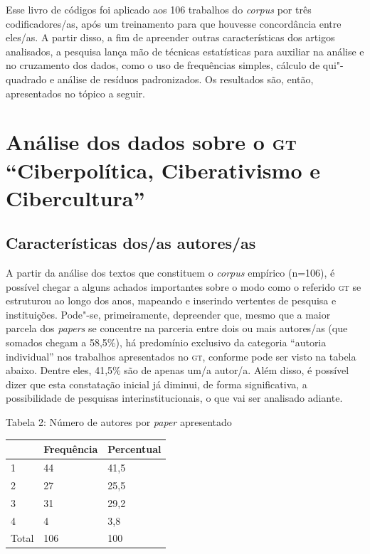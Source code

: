 Esse livro de códigos foi aplicado aos 106 trabalhos do \emph{corpus}
por três codificadores/as, após um treinamento para que houvesse
concordância entre eles/as. A partir disso, a fim de apreender outras
características dos artigos analisados, a pesquisa lança mão de técnicas
estatísticas para auxiliar na análise e no cruzamento dos dados, como o
uso de frequências simples, cálculo de qui"-quadrado e análise de
resíduos padronizados. Os resultados são, então, apresentados no tópico
a seguir.

\section{Análise dos dados sobre o \textsc{gt} ``Ciberpolítica, Ciberativismo e
Cibercultura''}

\subsection{Características dos/as autores/as}

A partir da análise dos textos que constituem o \emph{corpus} empírico
(n=106), é possível chegar a alguns achados importantes sobre o modo
como o referido \textsc{gt} se estruturou ao longo dos anos, mapeando e inserindo
vertentes de pesquisa e instituições. Pode"-se, primeiramente, depreender
que, mesmo que a maior parcela dos \emph{papers} se concentre na
parceria entre dois ou mais autores/as (que somados chegam a 58,5\%), há
predomínio exclusivo da categoria ``autoria individual'' nos trabalhos
apresentados no \textsc{gt}, conforme pode ser visto na tabela abaixo. Dentre
eles, 41,5\% são de apenas um/a autor/a. Além disso, é possível dizer
que esta constatação inicial já diminui, de forma significativa, a
possibilidade de pesquisas interinstitucionais, o que vai ser analisado
adiante.

\begin{center}
Tabela 2: Número de autores por \emph{paper} apresentado
\end{center}

\begin{center}
\centering
\begin{tabular}{|l|l|l|}
\hline
 & Frequência & Percentual \\ \hline
1 & 44 & 41,5 \\ \hline
2 & 27 & 25,5 \\ \hline
3 & 31 & 29,2 \\ \hline
4 & 4 & 3,8 \\ \hline
Total & 106 & 100 \\ \hline
\end{tabular}
\end{center}

